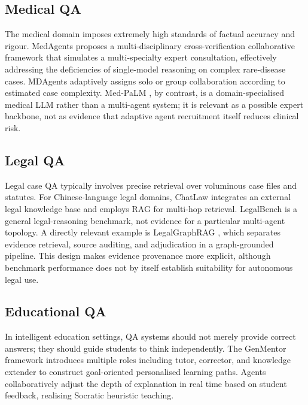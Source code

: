 \subsection{Medical QA}
\label{sec:medical}

The medical domain imposes extremely high standards of factual accuracy
and rigour.
MedAgents \citep{tang2024medagents} proposes a multi-disciplinary
cross-verification collaborative framework that simulates a multi-specialty
expert consultation, effectively addressing the deficiencies of single-model
reasoning on complex rare-disease cases.
MDAgents \citep{kim2024mdagents} adaptively assigns solo or group
collaboration according to estimated case complexity. Med-PaLM
\citep{singhal2023medpalm}, by contrast, is a domain-specialised medical LLM
rather than a multi-agent system; it is relevant as a possible expert backbone,
not as evidence that adaptive agent recruitment itself reduces clinical risk.

\subsection{Legal QA}
\label{sec:legal}

Legal case QA typically involves precise retrieval over voluminous case
files and statutes.
For Chinese-language legal domains, ChatLaw \citep{cui2023chatlaw}
integrates an external legal knowledge base and employs RAG for multi-hop
retrieval.
LegalBench \citep{guha2023legalbench} is a general legal-reasoning benchmark,
not evidence for a particular multi-agent topology. A directly relevant
example is LegalGraphRAG \citep{legalgraphrag2026}, which separates evidence
retrieval, source auditing, and adjudication in a graph-grounded pipeline.
This design makes evidence provenance more explicit, although benchmark
performance does not by itself establish suitability for autonomous legal use.

\subsection{Educational QA}
\label{sec:education}

In intelligent education settings, QA systems should not merely provide
correct answers; they should guide students to think independently.
The GenMentor framework \citep{li2024genmentor} introduces multiple roles
including tutor, corrector, and knowledge extender to construct
goal-oriented personalised learning paths.
Agents collaboratively adjust the depth of explanation in real time
based on student feedback, realising Socratic heuristic teaching.

